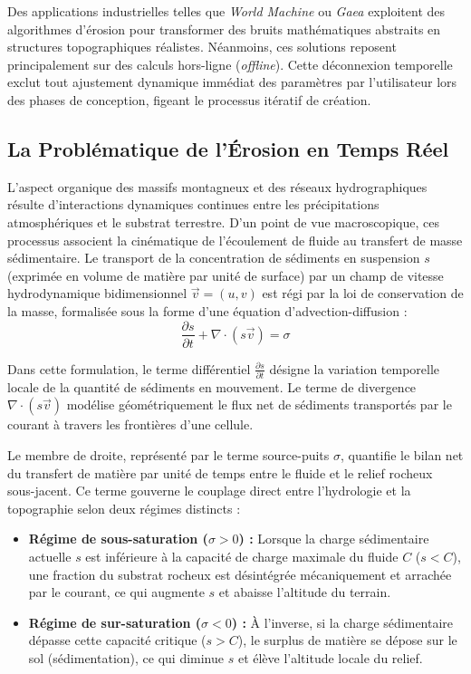 \documentclass[10pt,twocolumn,a4paper]{article}
\begin{document}
Des applications industrielles telles que \textit{World Machine} \cite{WorldMachine} ou \textit{Gaea} \cite{Gaea} exploitent des algorithmes d'érosion pour transformer des bruits mathématiques abstraits en structures topographiques réalistes. Néanmoins, ces solutions reposent principalement sur des calculs hors-ligne (\textit{offline}). Cette déconnexion temporelle exclut tout ajustement dynamique immédiat des paramètres par l'utilisateur lors des phases de conception, figeant le processus itératif de création.

\subsection{La Problématique de l'Érosion en Temps Réel}\label{subsec:problematique}
L'aspect organique des massifs montagneux et des réseaux hydrographiques résulte d'interactions dynamiques continues entre les précipitations atmosphériques et le substrat terrestre. D'un point de vue macroscopique, ces processus associent la cinématique de l'écoulement de fluide au transfert de masse sédimentaire. Le transport de la concentration de sédiments en suspension $s$ (exprimée en volume de matière par unité de surface) par un champ de vitesse hydrodynamique bidimensionnel $\vec{v} = (u, v)$ est régi par la loi de conservation de la masse, formalisée sous la forme d'une équation d'advection-diffusion :
\begin{equation}
    \frac{\partial s}{\partial t} + \nabla \cdot (s \vec{v}) = \sigma
\end{equation}

Dans cette formulation, le terme différentiel $\frac{\partial s}{\partial t}$ désigne la variation temporelle locale de la quantité de sédiments en mouvement. Le terme de divergence $\nabla \cdot (s \vec{v})$ modélise géométriquement le flux net de sédiments transportés par le courant à travers les frontières d'une cellule.

Le membre de droite, représenté par le terme source-puits $\sigma$, quantifie le bilan net du transfert de matière par unité de temps entre le fluide et le relief rocheux sous-jacent. Ce terme gouverne le couplage direct entre l'hydrologie et la topographie selon deux régimes distincts :
\begin{itemize}
    \item \textbf{Régime de sous-saturation ($\sigma > 0$) :} Lorsque la charge sédimentaire actuelle $s$ est inférieure à la capacité de charge maximale du fluide $C$ ($s < C$), une fraction du substrat rocheux est désintégrée mécaniquement et arrachée par le courant, ce qui augmente $s$ et abaisse l'altitude du terrain.
    \item \textbf{Régime de sur-saturation ($\sigma < 0$) :} À l'inverse, si la charge sédimentaire dépasse cette capacité critique ($s > C$), le surplus de matière se dépose sur le sol (sédimentation), ce qui diminue $s$ et élève l'altitude locale du relief.
\end{itemize}
\end{document}
